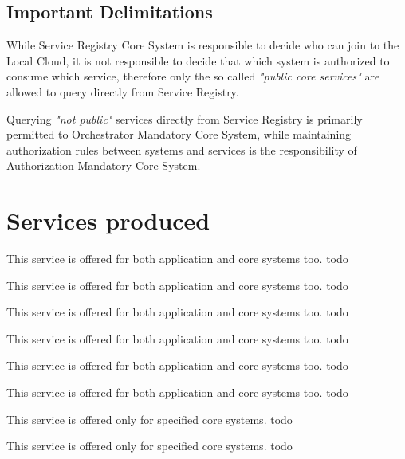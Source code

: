 \documentclass[a4paper]{arrowhead}
\begin{document}
\clearpage

\subsection{Important Delimitations}
\label{sec:delimitations}

While Service Registry Core System is responsible to decide who can join to the Local Cloud, it is not responsible to decide that which system is authorized to consume which service, therefore only the so called \textit{"public core services"} are allowed to query directly from Service Registry.

Querying \textit{"not public"} services directly from Service Registry is primarily permitted to Orchestrator Mandatory Core System, while maintaining authorization rules between systems and services is the responsibility of Authorization Mandatory Core System.

\newpage

\section{Services produced}
\label{sec:services}

This service is offered for both application and core systems too. \color{red}todo\color{black}

This service is offered for both application and core systems too.
\color{red}todo\color{black}

This service is offered for both application and core systems too.
\color{red}todo\color{black}

This service is offered for both application and core systems too.
\color{red}todo\color{black}

This service is offered for both application and core systems too.
\color{red}todo\color{black}

This service is offered for both application and core systems too.
\color{red}todo\color{black}

This service is offered only for specified core systems.
\color{red}todo\color{black}

This service is offered only for specified core systems.
\color{red}todo\color{black}
\end{document}
